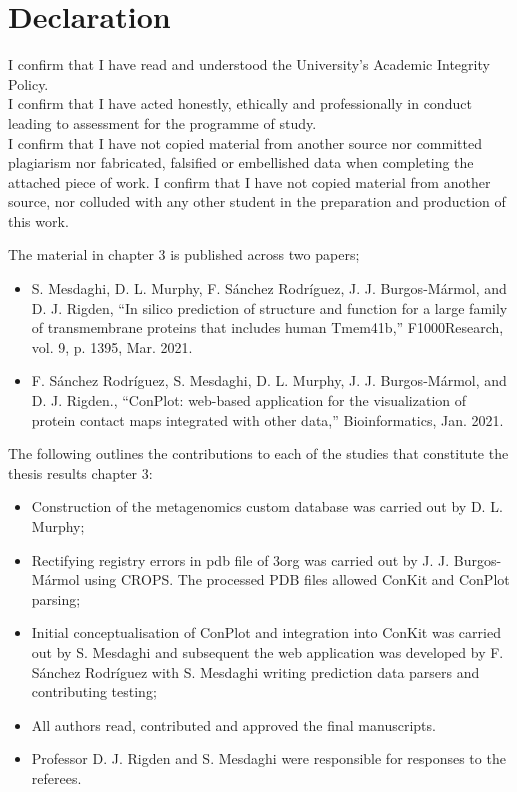 \documentclass[a4paper,oneside,12pt]{book}
\title{\thesistitle}
\author{\authorname}
\begin{document}

\doublespacing



\newpage
\chapter{Declaration}
I confirm that I have read and understood the University’s Academic Integrity Policy.\\
I confirm that I have acted honestly, ethically and professionally in conduct leading to assessment for the programme of study.\\ 
I confirm that I have not copied material from another source nor committed plagiarism nor fabricated, falsified or embellished data when completing the attached piece of work. I confirm that I have not copied material from another source, nor colluded with any other student in the preparation and production of this work.  


The material in chapter 3 is published across two papers;
\begin{itemize}
  \item S. Mesdaghi, D. L. Murphy, F. Sánchez Rodríguez, J. J. Burgos-Mármol, and D. J. Rigden, “In silico prediction of structure and function for a large family of transmembrane proteins that includes human Tmem41b,” F1000Research, vol. 9, p. 1395, Mar. 2021. 
  \item F. Sánchez Rodríguez, S. Mesdaghi, D. L. Murphy, J. J. Burgos-Mármol, and D. J. Rigden., “ConPlot: web-based application for the visualization of protein contact maps integrated with other data,” Bioinformatics, Jan. 2021.
\end{itemize}

The following outlines the contributions to each of the studies that constitute the thesis results chapter 3:
\begin{itemize}
    \item Construction of the metagenomics custom database was carried out by D. L. Murphy;
    \item Rectifying registry errors in pdb file of 3org was carried out by J. J. Burgos-Mármol using CROPS.  The processed PDB files allowed ConKit and ConPlot parsing;
    \item Initial conceptualisation of ConPlot and integration into ConKit was carried out by S. Mesdaghi and subsequent the web application was developed by F. Sánchez Rodríguez with S. Mesdaghi writing prediction data parsers and contributing testing;
    \item All authors read, contributed and approved the final manuscripts.
    \item Professor D. J. Rigden and S. Mesdaghi were responsible for responses to the referees.
\end{itemize}
\end{document}
